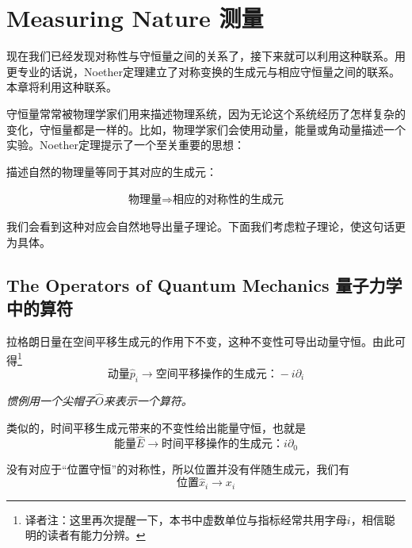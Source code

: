 


\chapter[测量]{Measuring Nature 测量}\label{chap5}

现在我们已经发现对称性与守恒量之间的关系了，接下来就可以利用这种联系。用更专业的话说，Noether定理建立了对称变换的生成元与相应守恒量之间的联系。本章将利用这种联系。

守恒量常常被物理学家们用来描述物理系统，因为无论这个系统经历了怎样复杂的变化，守恒量都是一样的。比如，物理学家们会使用动量，能量或角动量描述一个实验。Noether定理提示了一个至关重要的思想：

描述自然的物理量等同于其对应的生成元：

\begin{align}\label{equ5.1}
\text{物理量}\Rightarrow\text{相应的对称性的生成元}
\end{align}

我们会看到这种对应会自然地导出量子理论。下面我们考虑粒子理论，使这句话更为具体。

\section[量子力学中的算符]{The Operators of Quantum Mechanics 量子力学中的算符}\label{sec5.1}

拉格朗日量在空间平移生成元的作用下不变，这种不变性可导出动量守恒。由此可得\footnote{译者注：这里再次提醒一下，本书中虚数单位与指标经常共用字母$i$，相信聪明的读者有能力分辨。}
\[\text{动量} \hat{p}_i\to\text{空间平移操作的生成元：} - i\partial_i \]

{\itshape 惯例用一个尖帽子$\hat{O}$来表示一个算符。}

类似的，时间平移生成元带来的不变性给出能量守恒，也就是
\[\text{能量} \hat{E}\to\text{时间平移操作的生成元：} i\partial_0 \]

没有对应于“位置守恒”的对称性，所以位置并没有伴随生成元，我们有
\[\text{位置} \hat{x}_i\to x_i \]


